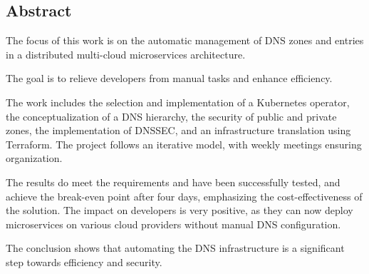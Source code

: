 
\begin{otherlanguage}{american}
	\chapter*{Abstract}
	The focus of this work is on the automatic management of DNS zones and entries in a distributed multi-cloud microservices architecture.
	\medskip

    \noindent
	The goal is to relieve developers from manual tasks and enhance efficiency.
	\medskip

	\noindent
	The work includes the selection and implementation of a Kubernetes operator, the conceptualization of a DNS hierarchy,
	the security of public and private zones, the implementation of DNSSEC, and an infrastructure translation using Terraform.
	The project follows an iterative model, with weekly meetings ensuring organization.
	\medskip

	\noindent
	The results do meet the requirements and have been successfully tested, and achieve the break-even point after four days,
	emphasizing the cost-effectiveness of the solution.
	The impact on developers is very positive, as they can now deploy microservices on various cloud providers without manual DNS configuration.
	\medskip

	\noindent
	The conclusion shows that automating the DNS infrastructure is a significant step towards efficiency and security.
\end{otherlanguage}
